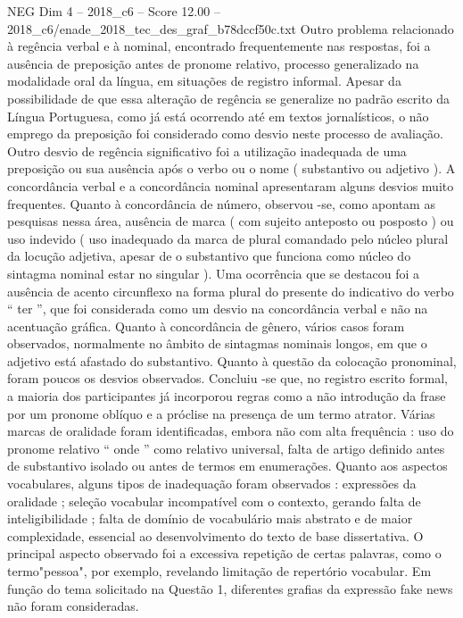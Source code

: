 \begin{textsample}{NEG Dim 4 – 2018\_c6 – Score 12.00 – 2018\_c6/enade\_2018\_tec\_des\_graf\_b78dccf50c.txt}
Outro problema relacionado à regência verbal e à nominal, encontrado frequentemente nas respostas, foi a ausência de preposição antes de pronome relativo, processo generalizado na modalidade oral da língua, em situações de registro informal.
Apesar da possibilidade de que essa alteração de regência se generalize no padrão escrito da Língua Portuguesa, como já está ocorrendo até em textos jornalísticos, o não emprego da preposição foi considerado como desvio neste processo de avaliação.
Outro desvio de regência significativo foi a utilização inadequada de uma preposição ou sua ausência após o verbo ou o nome ( substantivo ou adjetivo ).
A concordância verbal e a concordância nominal apresentaram alguns desvios muito frequentes.
Quanto à concordância de número, observou -se, como apontam as pesquisas nessa área, ausência de marca ( com sujeito anteposto ou posposto ) ou uso indevido ( uso inadequado da marca de plural comandado pelo núcleo plural da locução adjetiva, apesar de o substantivo que funciona como núcleo do sintagma nominal estar no singular ).
Uma ocorrência que se destacou foi a ausência de acento circunflexo na forma plural do presente do indicativo do verbo “ ter ”, que foi considerada como um desvio na concordância verbal e não na acentuação gráfica.
Quanto à concordância de gênero, vários casos foram observados, normalmente no âmbito de sintagmas nominais longos, em que o adjetivo está afastado do substantivo.
Quanto à questão da colocação pronominal, foram poucos os desvios observados.
Concluiu -se que, no registro escrito formal, a maioria dos participantes já incorporou regras como a não introdução da frase por um pronome oblíquo e a próclise na presença de um termo atrator.
Várias marcas de oralidade foram identificadas, embora não com alta frequência : uso do pronome relativo “ onde ” como relativo universal, falta de artigo definido antes de substantivo isolado ou antes de termos em enumerações.
Quanto aos aspectos vocabulares, alguns tipos de inadequação foram observados : expressões da oralidade ; seleção vocabular incompatível com o contexto, gerando falta de inteligibilidade ; falta de domínio de vocabulário mais abstrato e de maior complexidade, essencial ao desenvolvimento do texto de base dissertativa.
O principal aspecto observado foi a excessiva repetição de certas palavras, como o termo"pessoa", por exemplo, revelando limitação de repertório vocabular.
Em função do tema solicitado na Questão 1, diferentes grafias da expressão fake news não foram consideradas.

\end{textsample}
